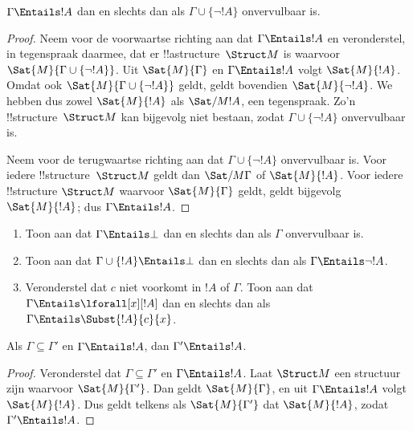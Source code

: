\documentclass[../../../include/open-logic-section]{subfiles}
\begin{document}
\begin{prop}
$\Gamma \Entails !A$ dan en slechts dan als
$\Gamma \cup \{\lnot !A\}$ onvervulbaar is.
\end{prop}

\begin{proof}
Neem voor de voorwaartse richting aan dat $\Gamma \Entails !A$ en
veronderstel, in tegenspraak daarmee, dat er !!a{structure}~$\Struct M$
is waarvoor $\Sat{M}{\Gamma \cup \{ \lnot !A \}}$. Uit
$\Sat{M}{\Gamma}$ en $\Gamma \Entails !A$ volgt $\Sat{M}{!A}$. Omdat
ook $\Sat{M}{\Gamma\cup \{ \lnot !A \}}$ geldt, geldt bovendien
$\Sat{M}{\lnot !A}$. We hebben dus zowel $\Sat{M}{!A}$ als
$\Sat/{M}{!A}$, een tegenspraak. Zo'n !!{structure}~$\Struct M$ kan
bijgevolg niet bestaan, zodat $\Gamma \cup \{ \lnot !A \}$
onvervulbaar is.

Neem voor de terugwaartse richting aan dat
$\Gamma \cup \{ \lnot !A \}$ onvervulbaar is. Voor iedere
!!{structure}~$\Struct M$ geldt dan $\Sat/{M}{\Gamma}$ of
$\Sat{M}{!A}$. Voor iedere !!{structure} $\Struct M$ waarvoor
$\Sat{M}{\Gamma}$ geldt, geldt bijgevolg $\Sat{M}{!A}$; dus
$\Gamma \Entails !A$.
\end{proof}

\begin{prob}
\begin{enumerate}
\item Toon aan dat $\Gamma \Entails \bot$ dan en slechts dan als
  $\Gamma$ onvervulbaar is.
\item Toon aan dat $\Gamma \cup \{!A\} \Entails \bot$ dan en slechts
  dan als $\Gamma \Entails \lnot !A$.
\item Veronderstel dat $c$ niet voorkomt in $!A$ of $\Gamma$. Toon aan
  dat $\Gamma \Entails \lforall[x][!A]$ dan en slechts dan als
  $\Gamma \Entails
  \Subst{!A}{c}{x}$.
\end{enumerate}
\end{prob}

\begin{prop}
Als $\Gamma \subseteq \Gamma'$ en $\Gamma \Entails !A$, dan
$\Gamma' \Entails !A$.
\end{prop}

\begin{proof}
Veronderstel dat $\Gamma \subseteq \Gamma'$ en $\Gamma \Entails !A$.
Laat $\Struct M$ een structuur zijn waarvoor $\Sat{M}{\Gamma'}$.
Dan geldt $\Sat{M}{\Gamma}$, en uit $\Gamma \Entails !A$ volgt
$\Sat{M}{!A}$. Dus geldt telkens als $\Sat{M}{\Gamma'}$ dat
$\Sat{M}{!A}$, zodat $\Gamma' \Entails !A$.
\end{proof}
\end{document}
